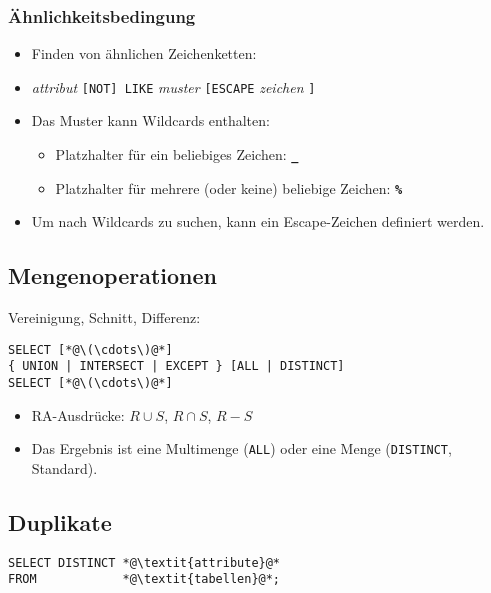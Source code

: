 \documentclass[a4paper, 11pt, accentcolor = tud3b]{tudreport}
\begin{document}
                \subsubsection{Ähnlichkeitsbedingung} %
                    \begin{itemize}
                    	\item Finden von ähnlichen Zeichenketten:
                    	\item[] \textit{attribut} \lstinline|[NOT] LIKE| \textit{muster} \lstinline|[ESCAPE| \textit{zeichen} \lstinline|]|
                    	\item Das Muster kann Wildcards enthalten:
                    		\begin{itemize}
                    			\item Platzhalter für ein beliebiges Zeichen: \textbf{\texttt{\_}}
                    			\item Platzhalter für mehrere (oder keine) beliebige Zeichen: \textbf{\texttt{\%}}
                    		\end{itemize}
                    	\item Um nach Wildcards zu suchen, kann ein Escape-Zeichen definiert werden.
                    \end{itemize}

            \subsection{Mengenoperationen} %
            	Vereinigung, Schnitt, Differenz:
                \begin{lstlisting}
SELECT [*@\(\cdots\)@*]
{ UNION | INTERSECT | EXCEPT } [ALL | DISTINCT]
SELECT [*@\(\cdots\)@*]
                \end{lstlisting}
                
                \begin{itemize}
                	\item RA-Ausdrücke: \( R \cup S \), \( R \cap S \), \( R - S \)
                	\item Das Ergebnis ist eine Multimenge (\lstinline|ALL|) oder eine Menge (\lstinline|DISTINCT|, Standard).
                \end{itemize}

            \subsection{Duplikate} %
                \begin{lstlisting}
SELECT DISTINCT *@\textit{attribute}@*
FROM            *@\textit{tabellen}@*;
                \end{lstlisting}
                
\end{document}
